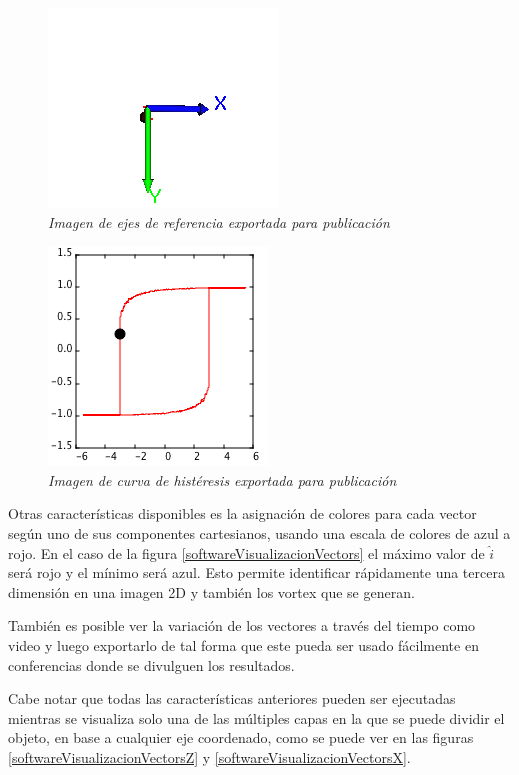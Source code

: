 \begin{figure}[ht]
  \centering
  \includegraphics[scale=.6]{images/softwareVisualizacionAxes}
  \caption{\em Imagen de ejes de referencia exportada para publicación}
  \label{softwareVisualizacionAxes}
\end{figure}


\begin{figure}[ht]
  \centering
  \includegraphics[scale=.6]{images/softwareVisualizacionPlot}
  \caption{\em Imagen de curva de histéresis exportada para publicación}
  \label{softwareVisualizacionPlot}
\end{figure}

Otras características disponibles es la asignación de colores para cada vector según uno de sus componentes cartesianos, usando una escala de colores de azul a rojo. En el caso de la figura \ref{softwareVisualizacionVectors} el máximo valor de $\hat{i}$ será rojo y el mínimo será azul. Esto permite identificar rápidamente una tercera dimensión en una imagen 2D y también los vortex que se generan.

También es posible ver la variación de los vectores a través del tiempo como video y luego exportarlo de tal forma que este pueda ser usado fácilmente en conferencias donde se divulguen los resultados.

Cabe notar que todas las características anteriores pueden ser ejecutadas mientras se visualiza solo una de las múltiples capas en la que se puede dividir el objeto, en base a cualquier eje coordenado, como se puede ver en las figuras \ref{softwareVisualizacionVectorsZ} y \ref{softwareVisualizacionVectorsX}.

